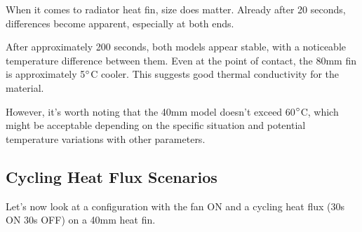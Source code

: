 \documentclass{article}
\begin{document}
When it comes to radiator heat fin, size does matter. Already after 20 seconds, differences become apparent, especially at both ends.

After approximately 200 seconds, both models appear stable, with a noticeable temperature difference between them. Even at the point of contact, the 80mm fin is approximately 5$\degree$C cooler. This suggests good thermal conductivity for the material.

However, it's worth noting that the 40mm model doesn't exceed 60$\degree$C, which might be acceptable depending on the specific situation and potential temperature variations with other parameters.

\subsection{Cycling Heat Flux Scenarios}
Let's now look at a configuration with the fan ON and a cycling heat flux (30s ON 30s OFF) on a 40mm heat fin.\\
\end{document}
